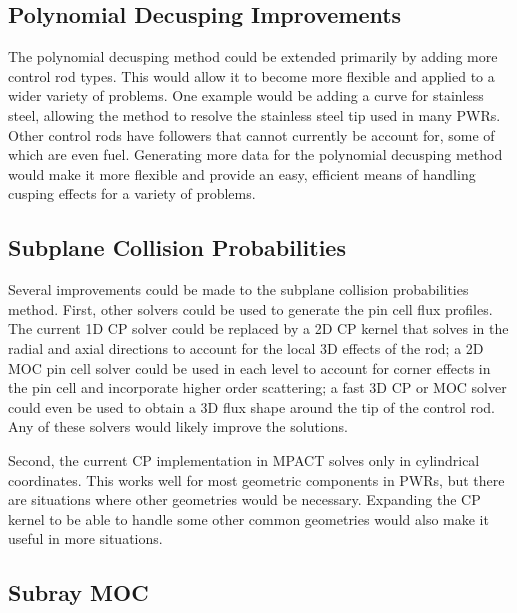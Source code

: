 \subsection{Polynomial Decusping Improvements}

The polynomial decusping method could be extended primarily by adding more control rod types.  This would allow it to become more flexible and applied to a wider variety of problems.  One example would be adding a curve for stainless steel, allowing the method to resolve the stainless steel tip used in many PWRs.  Other control rods have followers that cannot currently be account for, some of which are even fuel.  Generating more data for the polynomial decusping method would make it more flexible and provide an easy, efficient means of handling cusping effects for a variety of problems.


\subsection{Subplane Collision Probabilities}

Several improvements could be made to the subplane collision probabilities method.  First, other solvers could be used to generate the pin cell flux profiles.  The current 1D CP solver could be replaced by a 2D CP kernel that solves in the radial and axial directions to account for the local 3D effects of the rod; a 2D MOC pin cell solver could be used in each level to account for corner effects in the pin cell and incorporate higher order scattering; a fast 3D CP or MOC solver could even be used to obtain a 3D flux shape around the tip of the control rod.  Any of these solvers would likely improve the solutions.

Second, the current CP implementation in MPACT solves only in cylindrical coordinates.  This works well for most geometric components in PWRs, but there are situations where other geometries would be necessary.  Expanding the CP kernel to be able to handle some other common geometries would also make it useful in more situations.

\subsection{Subray MOC}

